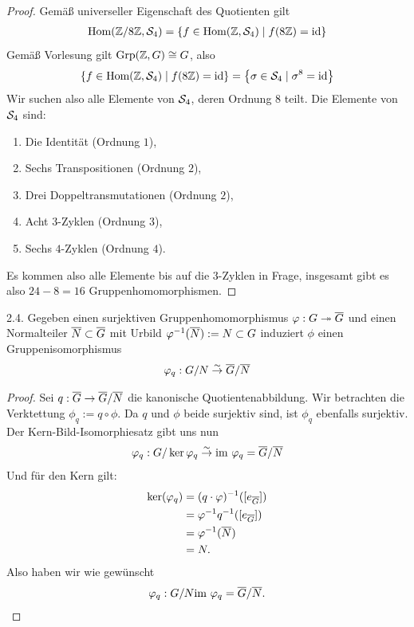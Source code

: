 \documentclass{article}
\newcommand{\ex}[1]{\tit{Übung} #1.}
\begin{document}
		\begin{proof}
			Gemäß universeller Eigenschaft des Quotienten gilt
			\begin{align*}
				\textnormal{Hom}(\mathbb{Z}/8\mathbb{Z}, \mathcal{S}_4) = \qty{f \in \textnormal{Hom}(\mathbb{Z}, \mathcal{S}_4) \mid f(8\mathbb{Z}) = \textnormal{id}}
			\end{align*}
			Gemäß Vorlesung gilt $\textnormal{Grp}(\mathbb{Z}, G) \cong G$, also
			\begin{align*}
				\qty{f \in \textnormal{Hom}(\mathbb{Z}, \mathcal{S}_4) \mid f(8\mathbb{Z}) = \textnormal{id}}
				= \qty{\sigma \in \mathcal{S}_4 \mid \sigma^8 = \textnormal{id}}
			\end{align*}
			Wir suchen also alle Elemente von $\mathcal{S}_4$, deren Ordnung $8$ teilt. Die Elemente von $\mathcal{S}_4$ sind:
			\begin{enumerate}
				\item Die Identität (Ordnung $1$),
				\item Sechs Transpositionen (Ordnung $2$),
				\item Drei Doppeltransmutationen (Ordnung $2$),
				\item Acht $3$-Zyklen (Ordnung $3$),
				\item Sechs $4$-Zyklen (Ordnung $4$).
			\end{enumerate}
			Es kommen also alle Elemente bis auf die $3$-Zyklen in Frage, insgesamt gibt es also $24 - 8 = 16$ Gruppenhomomorphismen.
		\end{proof}
		\newpar
		\ex{2.4} Gegeben einen surjektiven Gruppenhomomorphismus $\varphi : G \twoheadrightarrow \overline{{G}}$ und einen Normalteiler $\overline{{N}} \subset \overline{{G}}$ mit Urbild $\varphi^{-1}(\overline{{N}}) := N \subset G$ induziert $\phi$ einen Gruppenisomorphismus
		\begin{align*}
			\varphi_q : G/N \overset{\sim}{\rightarrow} \overline{{G}} / \overline{{N}}
		\end{align*}
		\begin{proof}
			Sei $q : \overline{{G}} \to \overline{{G}} / \overline{{N}}$ die kanonische Quotientenabbildung. Wir betrachten die Verktettung $\phi_q := q \circ \phi$. Da $q$ und $\phi$ beide surjektiv sind, ist $\phi_q$ ebenfalls surjektiv. Der Kern-Bild-Isomorphiesatz gibt uns nun
			\begin{align*}
				\varphi_q : G/\ker \varphi_q \overset{\sim}{\rightarrow} \textnormal{im}~ \varphi_q = \overline{{G}} / \overline{{N}}
			\end{align*}
			Und für den Kern gilt:
			\begin{align*}
				\ker(\varphi_q) 
				&= (q \cdot \varphi)^{-1}([e_{\overline{{G}}}])\\
				&= \varphi^{-1} q^{-1} ([e_{\overline{{G}}}])\\
				&= \varphi^{-1}(\overline{{N}})\\
				&= N.
			\end{align*}
			Also haben wir wie gewünscht
			\begin{align*}
				\varphi_q : G/N \textnormal{im}~ \varphi_q = \overline{{G}} / \overline{{N}}.
			\end{align*}
		\end{proof}
\end{document}
